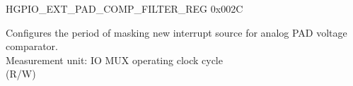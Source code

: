 \begin{register}{H}{GPIO\_EXT\_PAD\_COMP\_FILTER\_REG }{0x002C}\label{regdesc:GPIOSDPADCOMPFILTERREG}
%
\regnewline%
\begin{regdesc}\begin{reglist}
\label{fielddesc:GPIOSDZERODETFILTERCNT}\item [GPIO\_EXT\_ZERO\_DET\_FILTER\_CNT] Configures the period of masking new interrupt source for analog PAD voltage comparator.\\
Measurement unit: IO MUX operating clock cycle\\(R/W)
\end{reglist}\end{regdesc}
\end{register}


